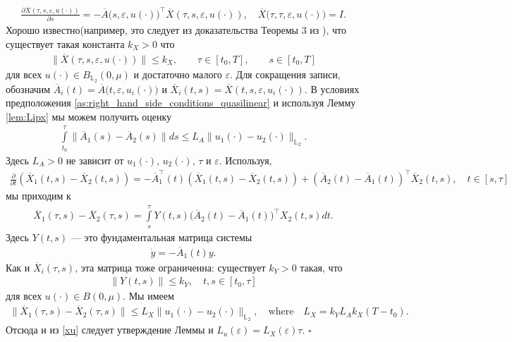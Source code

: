 \documentclass[../main.tex]{subfiles}
\begin{document}
\begin{gather*}
    \frac{\partial \overline{X}(\tau,s,\varepsilon,u(\cdot))}{\partial s} = -\overline{A}\big(s,\varepsilon,u(\cdot)\big)^{\top} \overline{X}(\tau,s,\varepsilon,u(\cdot)), \quad \overline{X}\big(\tau,\tau,\varepsilon,u(\cdot)\big) = I.
\end{gather*}
Хорошо известно(например, это следует из доказательства Теоремы 3 из \cite{Fillipov}), что существует такая константа $k_X>0$ что
\begin{gather*}
    \| \overline{X}(\tau,s,\varepsilon,u(\cdot)) \| \leqslant k_X, \qquad \tau \in [t_0,T], \qquad s \in [t_0,T]
\end{gather*}
для всех $u(\cdot) \in B_{\mathbb{L}_2}(0,\mu)$ и достаточно малого $\varepsilon $. Для сокращения записи, обозначим $\overline{A}_i(t) = \overline{A}\big(t,\varepsilon,u_i(\cdot)\big) $ и $ \overline{X}_i(t,s) = \overline{X}(t,s,\varepsilon,u_i(\cdot))$. В условиях предположения \ref{as:right_hand_side_conditions_quasilinear} и используя Лемму \ref{lem:Lipx} мы можем получить оценку
\begin{gather*}
    \int\limits_{t_0}^{\tau} \|\overline{A}_1(s) - \overline{A}_2(s) \| ds \leqslant L_A \| u_1(\cdot) - u_2(\cdot) \|_{\mathbb{L}_2}. 
\end{gather*}
Здесь $L_A>0$ не зависит от $u_1(\cdot)$, $u_2(\cdot)$, $\tau$ и $\varepsilon$. Используя,
\begin{gather*}
    \frac{\partial}{\partial t} \left(\overline{X}_1(t,s) - \overline{X}_2(t,s) \right) = -\overline{A}_1^{\top}(t) \left(\overline{X}_1(t,s) - \overline{X}_2(t,s) \right) + (\overline{A}_2(t) - \overline{A}_1(t))^{\top} \overline{X}_2(t,s), \quad t \in [s,\tau]
\end{gather*}
мы приходим к
\begin{gather*}
    \overline{X}_1(\tau,s) - \overline{X}_2(\tau,s) = \int\limits_s^{\tau} Y(t,s) \big(\overline{A}_2(t) - \overline{A}_1(t)\big)^{\top} X_2(t,s) dt.
\end{gather*}
Здесь $Y(t,s)$ --- это фундаментальная матрица системы 
\begin{gather*}
    \dot{y} = -\overline{A}_1(t) y.
\end{gather*}
Как и $\overline{X}_i(\tau,s)$, эта матрица тоже ограниченна: существует $k_Y>0$ такая, что
\begin{gather*}
    \|Y(t,s)\| \leqslant k_Y, \quad t,s \in [t_0, \tau]
\end{gather*}
для всех $u(\cdot) \in B(0,\mu)$. Мы имеем
\begin{gather*}
    \| \overline{X}_1(\tau,s) - \overline{X}_2(\tau,s) \| \leqslant L_X \| u_1(\cdot) - u_2(\cdot) \|_{\mathbb{L}_2}, \quad \mbox{where} \quad L_X = k_Y L_A k_X (T - t_0) .
\end{gather*}
Отсюда и из \eqref{xu} следует утверждение Леммы и $L_u(\varepsilon) = L_X(\varepsilon)\tau $.
\hfill$\square$\\[1ex]%
\end{document}
